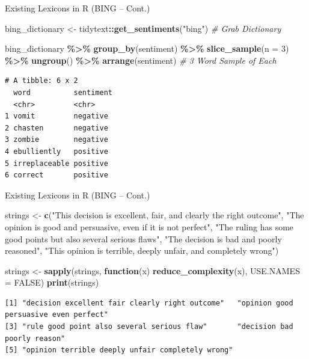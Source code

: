 \documentclass[
  ignorenonframetext,
  aspectratio=169]{beamer}
\newenvironment{Shaded}{\begin{snugshade}}{\end{snugshade}}
\newcommand{\AttributeTok}[1]{\textcolor[rgb]{0.13,0.29,0.53}{#1}}
\newcommand{\CommentTok}[1]{\textcolor[rgb]{0.56,0.35,0.01}{\textit{#1}}}
\newcommand{\ConstantTok}[1]{\textcolor[rgb]{0.56,0.35,0.01}{#1}}
\newcommand{\ControlFlowTok}[1]{\textcolor[rgb]{0.13,0.29,0.53}{\textbf{#1}}}
\newcommand{\DecValTok}[1]{\textcolor[rgb]{0.00,0.00,0.81}{#1}}
\newcommand{\FunctionTok}[1]{\textcolor[rgb]{0.13,0.29,0.53}{\textbf{#1}}}
\newcommand{\NormalTok}[1]{#1}
\newcommand{\OtherTok}[1]{\textcolor[rgb]{0.56,0.35,0.01}{#1}}
\newcommand{\SpecialCharTok}[1]{\textcolor[rgb]{0.81,0.36,0.00}{\textbf{#1}}}
\newcommand{\StringTok}[1]{\textcolor[rgb]{0.31,0.60,0.02}{#1}}
\begin{document}
\begin{frame}[fragile]{Existing Lexicons in R (BING -- Cont.)}
\label{existing-lexicons-in-r-bing-cont.}
\scriptsize

\begin{Shaded}
\begin{Highlighting}[]
\NormalTok{bing\_dictionary }\OtherTok{\textless{}{-}}\NormalTok{ tidytext}\SpecialCharTok{::}\FunctionTok{get\_sentiments}\NormalTok{(}\StringTok{"bing"}\NormalTok{) }\CommentTok{\# Grab Dictionary}

\NormalTok{bing\_dictionary }\SpecialCharTok{\%\textgreater{}\%}
  \FunctionTok{group\_by}\NormalTok{(sentiment) }\SpecialCharTok{\%\textgreater{}\%}
  \FunctionTok{slice\_sample}\NormalTok{(}\AttributeTok{n =} \DecValTok{3}\NormalTok{) }\SpecialCharTok{\%\textgreater{}\%}
  \FunctionTok{ungroup}\NormalTok{() }\SpecialCharTok{\%\textgreater{}\%}
  \FunctionTok{arrange}\NormalTok{(sentiment) }\CommentTok{\# 3 Word Sample of Each}
\end{Highlighting}
\end{Shaded}

\begin{verbatim}
# A tibble: 6 x 2
  word          sentiment
  <chr>         <chr>    
1 vomit         negative 
2 chasten       negative 
3 zombie        negative 
4 ebulliently   positive 
5 irreplaceable positive 
6 correct       positive 
\end{verbatim}
\end{frame}

\begin{frame}[fragile]{Existing Lexicons in R (BING -- Cont.)}
\label{existing-lexicons-in-r-bing-cont.-1}
\scriptsize

\begin{Shaded}
\begin{Highlighting}[]
\NormalTok{strings }\OtherTok{\textless{}{-}} \FunctionTok{c}\NormalTok{(}\StringTok{"This decision is excellent, fair, and clearly the right outcome"}\NormalTok{,}
    \StringTok{"The opinion is good and persuasive, even if it is not perfect"}\NormalTok{,}
    \StringTok{"The ruling has some good points but also several serious flaws"}\NormalTok{,}
    \StringTok{"The decision is bad and poorly reasoned"}\NormalTok{, }\StringTok{"This opinion is terrible, deeply unfair, and completely wrong"}\NormalTok{)}

\NormalTok{strings }\OtherTok{\textless{}{-}} \FunctionTok{sapply}\NormalTok{(strings, }\ControlFlowTok{function}\NormalTok{(x) }\FunctionTok{reduce\_complexity}\NormalTok{(x),}
    \AttributeTok{USE.NAMES =} \ConstantTok{FALSE}\NormalTok{)}
\FunctionTok{print}\NormalTok{(strings)}
\end{Highlighting}
\end{Shaded}

\begin{verbatim}
[1] "decision excellent fair clearly right outcome"   "opinion good persuasive even perfect"           
[3] "rule good point also several serious flaw"       "decision bad poorly reason"                     
[5] "opinion terrible deeply unfair completely wrong"
\end{verbatim}
\end{frame}
\end{document}
